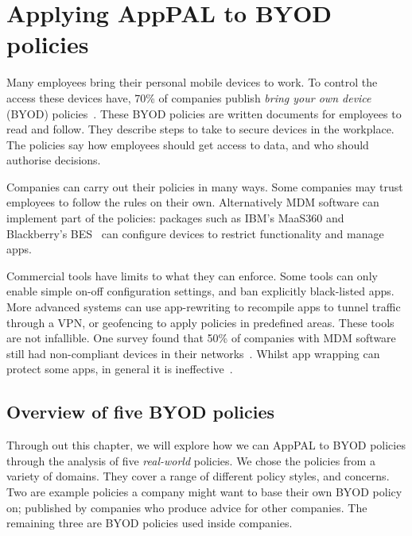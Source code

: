 \documentclass[thesis.tex]{subfiles}
\begin{document}
\chapter{Applying AppPAL to BYOD policies}
\label{chap:byod}

Many employees bring their personal mobile devices to work. To control the
access these devices have, 70\% of companies publish \emph{bring your own
  device} (BYOD) policies~\cite{schulze_byod_2016}. These BYOD policies are
written documents for employees to read and follow. They describe steps to take
to secure devices in the workplace. The policies say how employees
should get access to data, and who should authorise decisions.

Companies can carry out their policies in many ways. Some companies
may trust employees to follow the rules on their own. Alternatively \ac{MDM}
software can implement part of the policies: packages such as IBM's MaaS360 and
Blackberry's BES~\cite{_ibm_????,_secure_????} can configure devices to
restrict functionality and manage apps.

Commercial tools have limits to what they can enforce. Some tools can
only enable simple on-off configuration settings, and ban explicitly
black-listed apps. More advanced systems can use app-rewriting to recompile
apps to tunnel traffic through a VPN, or geofencing to apply policies in
predefined areas. These tools are not infallible. One survey found that 50\% of
companies with \ac{MDM} software still had non-compliant devices in their
networks~\cite{mobileiron_security_labs_q4_2015}. Whilst app wrapping can
protect some apps, in general it is ineffective~\cite{hao_effectiveness_2013}.

\section{Overview of five BYOD policies}
\label{sec:overview-of-five-byod-policies}

Through out this chapter, we will explore how we can AppPAL to BYOD policies through the analysis of five \emph{real-world} policies.
We chose the policies from a variety of domains.
They cover a range of different policy styles, and concerns.
Two are example policies a company might want to base their own BYOD policy on; published by companies who produce advice for other companies.
The remaining three are BYOD policies used inside companies.
\end{document}
